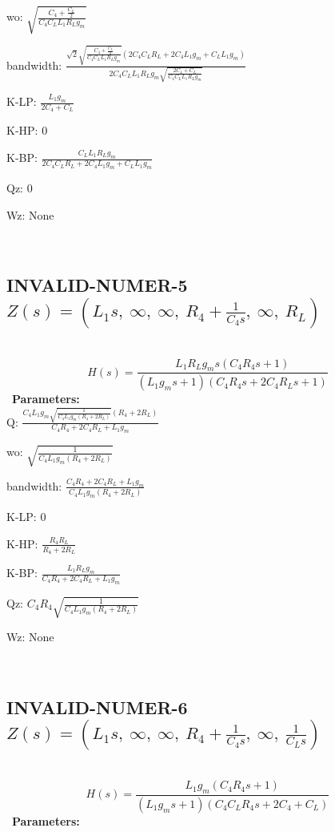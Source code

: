 \documentclass{article}
\begin{document}
wo: $\sqrt{\frac{C_{4} + \frac{C_{L}}{2}}{C_{4} C_{L} L_{1} R_{L} g_{m}}}$\ 

bandwidth: $\frac{\sqrt{2} \sqrt{\frac{C_{4} + \frac{C_{L}}{2}}{C_{4} C_{L} L_{1} R_{L} g_{m}}} \left(2 C_{4} C_{L} R_{L} + 2 C_{4} L_{1} g_{m} + C_{L} L_{1} g_{m}\right)}{2 C_{4} C_{L} L_{1} R_{L} g_{m} \sqrt{\frac{2 C_{4} + C_{L}}{C_{4} C_{L} L_{1} R_{L} g_{m}}}}$\ 

K-LP: $\frac{L_{1} g_{m}}{2 C_{4} + C_{L}}$\ 

K-HP: $0$\ 

K-BP: $\frac{C_{L} L_{1} R_{L} g_{m}}{2 C_{4} C_{L} R_{L} + 2 C_{4} L_{1} g_{m} + C_{L} L_{1} g_{m}}$\ 

Qz: $0$\ 

Wz: $\text{None}$\ 

\ 

\subsection{INVALID-NUMER-5 $Z(s) = \left( L_{1} s, \  \infty, \  \infty, \  R_{4} + \frac{1}{C_{4} s}, \  \infty, \  R_{L}\right)$ } \ 
\textbf{\[H(s) = \frac{L_{1} R_{L} g_{m} s \left(C_{4} R_{4} s + 1\right)}{\left(L_{1} g_{m} s + 1\right) \left(C_{4} R_{4} s + 2 C_{4} R_{L} s + 1\right)}\] } \ 
\textbf{Parameters:}\\ 

Q: $\frac{C_{4} L_{1} g_{m} \sqrt{\frac{1}{C_{4} L_{1} g_{m} \left(R_{4} + 2 R_{L}\right)}} \left(R_{4} + 2 R_{L}\right)}{C_{4} R_{4} + 2 C_{4} R_{L} + L_{1} g_{m}}$\ 

wo: $\sqrt{\frac{1}{C_{4} L_{1} g_{m} \left(R_{4} + 2 R_{L}\right)}}$\ 

bandwidth: $\frac{C_{4} R_{4} + 2 C_{4} R_{L} + L_{1} g_{m}}{C_{4} L_{1} g_{m} \left(R_{4} + 2 R_{L}\right)}$\ 

K-LP: $0$\ 

K-HP: $\frac{R_{4} R_{L}}{R_{4} + 2 R_{L}}$\ 

K-BP: $\frac{L_{1} R_{L} g_{m}}{C_{4} R_{4} + 2 C_{4} R_{L} + L_{1} g_{m}}$\ 

Qz: $C_{4} R_{4} \sqrt{\frac{1}{C_{4} L_{1} g_{m} \left(R_{4} + 2 R_{L}\right)}}$\ 

Wz: $\text{None}$\ 

\ 

\subsection{INVALID-NUMER-6 $Z(s) = \left( L_{1} s, \  \infty, \  \infty, \  R_{4} + \frac{1}{C_{4} s}, \  \infty, \  \frac{1}{C_{L} s}\right)$ } \ 
\textbf{\[H(s) = \frac{L_{1} g_{m} \left(C_{4} R_{4} s + 1\right)}{\left(L_{1} g_{m} s + 1\right) \left(C_{4} C_{L} R_{4} s + 2 C_{4} + C_{L}\right)}\] } \ 
\textbf{Parameters:}\\ 
\end{document}
